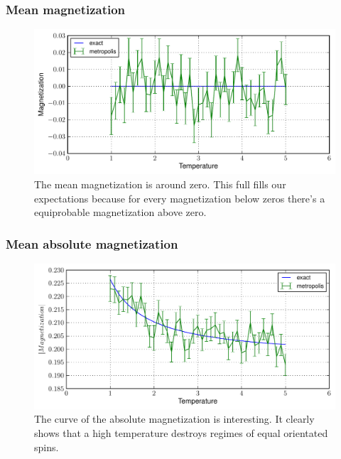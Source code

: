 \documentclass[12pt,a4paper]{scrartcl}
\begin{document}
\subsubsection{Mean magnetization}
\begin{figure}[H]
\includegraphics[width=14.0cm]{../plots/ising_02.pdf}
\caption{The mean magnetization is around zero. This full fills our expectations because for every magnetization below zeros there's a equiprobable  magnetization above zero.}
\end{figure}

\subsubsection{Mean absolute magnetization}
\begin{figure}[H]
\includegraphics[width=14.0cm]{../plots/ising_03.pdf}
\caption{The curve of the absolute magnetization is interesting. It clearly shows that a high temperature destroys regimes of equal orientated spins.} 
\end{figure}
\end{document}

